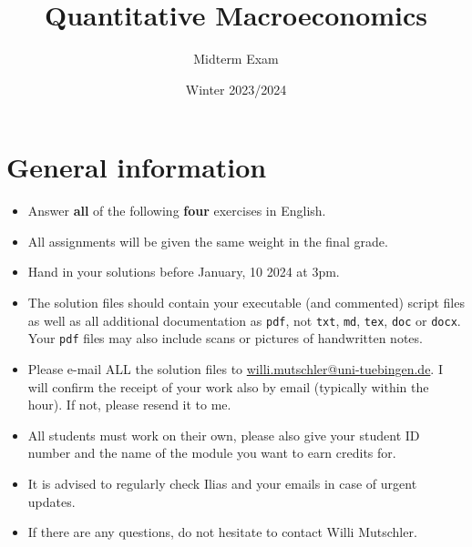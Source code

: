 \documentclass{article}
\begin{document}
\title{Quantitative Macroeconomics}
\author{Midterm Exam}
\date{Winter 2023/2024}
\maketitle

\section*{General information}
\begin{itemize}
	\item Answer \textbf{all} of the following \textbf{four} exercises in English.
	\item All assignments will be given the same weight in the final grade.
	\item Hand in your solutions before January, 10 2024 at 3pm.
	\item The solution files should contain your executable (and commented) script files
		as well as all additional documentation as \texttt{pdf}, not \texttt{txt}, \texttt{md}, \texttt{tex}, \texttt{doc} or \texttt{docx}.
	Your \texttt{pdf} files may also include scans or pictures of handwritten notes.
	\item Please e-mail ALL the solution files to \url{willi.mutschler@uni-tuebingen.de}.
	I will confirm the receipt of your work also by email (typically within the hour). If not, please resend it to me.
	\item All students must work on their own, please also give your student ID number and the name of the module you want to earn credits for.
	\item It is advised to regularly check Ilias and your emails in case of urgent updates.
	\item If there are any questions, do not hesitate to contact Willi Mutschler.
\end{itemize}

\newpage
\end{document}
